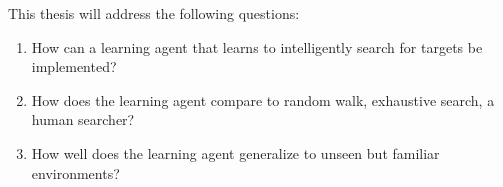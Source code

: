 % 
% 
% 
% 
% 
% 
% 
% 

This thesis will address the following questions:

\begin{enumerate}
  \item \label{itm:rq1} How can a learning agent that learns to intelligently search for targets be implemented?
  \item \label{itm:rq2} How does the learning agent compare to random walk, exhaustive search, a human searcher?
  \item \label{itm:rq3} How well does the learning agent generalize to unseen but familiar environments?
\end{enumerate}

